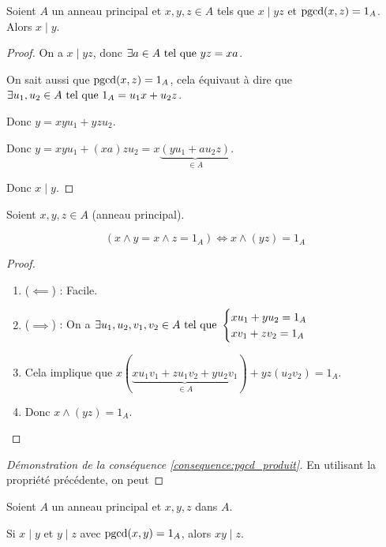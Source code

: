\documentclass[12pt,a4paper]{report}
\begin{document}
\begin{theorem}
    Soient $A$ un anneau principal et $x,y,z \in A$ tels que $x \mid yz$ et $\mathrm{pgcd}(x,z)=1_A$. Alors $x \mid y$.
    
\end{theorem}

\begin{proof}
    On a $x\mid yz$, donc $\exists a \in A \text{ tel que } yz = xa$.

    On sait aussi que $\mathrm{pgcd}(x,z)=1_A$, cela équivaut à dire que $\exists u_1,u_2 \in A \text{ tel que } 1_A = u_1 x + u_2 z$.

    Donc $y= xyu_1+yzu_2$.

    Donc $y= xyu_1 + (xa)zu_2 = x\underbrace{(yu_1 + au_2 z)}_{\in A}$.
    
    Donc $x \mid y$.
\end{proof}

\begin{property}
    Soient $x,y,z \in A$ (anneau principal).

    $$(x\wedge y = x \wedge z= 1_A) \iff x\wedge (yz) = 1_A$$
\end{property}

\begin{proof}
    \begin{enumerate}
        \item ($\impliedby$) : Facile.
        \item ($\implies$) : On a $\exists u_1,u_2,v_1,v_2 \in A \text{ tel que } \begin{cases}xu_1 + y u_2 = 1_A\\xv_1 + z v_2 = 1_A\end{cases}$
        \item Cela implique que $x(\underbrace{xu_1v_1+zu_1v_2+yu_2v_1}_{\in A}) + yz(u_2v_2) = 1_A$.
        \item Donc $x \wedge (yz) = 1_A$.
    \end{enumerate}
\end{proof}

\begin{proof}[Démonstration de la conséquence \ref{consequence:pgcd_produit}]
    En utilisant la propriété précédente, on peut
    
\end{proof}

\begin{property}
    Soient $A$ un anneau principal et $x,y,z$ dans $A$.

    Si $x\mid y$ et $y\mid z$ avec $\mathrm{pgcd}(x,y)=1_A$, alors $xy \mid z$.
\end{property}
\end{document}
